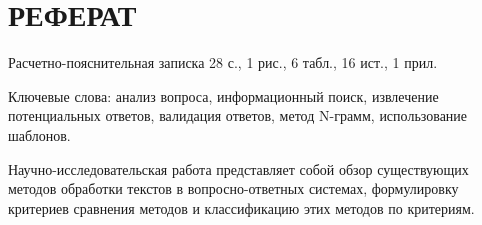 \setcounter{page}{3}
\chapter*{РЕФЕРАТ}

Расчетно-пояснительная записка 28 с., 1 рис., 6 табл., 16 ист., 1 прил.

Ключевые слова: анализ вопроса, информационный поиск, извлечение потенциальных ответов, валидация ответов, метод N-грамм, использование шаблонов.

Научно-исследовательская работа представляет собой обзор существующих методов обработки текстов в вопросно-ответных системах, формулировку критериев сравнения методов и классификацию этих методов по критериям.

